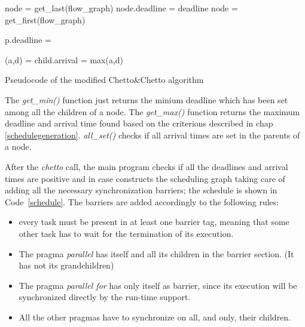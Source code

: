 \documentclass[a4paper,11pt,oneside]{book}
\begin{document}
\begin{algorithm}[H]
\begin{algorithmic}
\State node = get\_last(flow\_graph)
\State node.deadline = deadline
\State {}
\State node = get\_first(flow\_graph)
\State {}
\EndFunction

\end{algorithmic}

\begin{algorithmic}
\State p.deadline =  
\EndFor
{}
\State {}
\EndFor
\EndIf
\EndFunction

\end{algorithmic}

\begin{algorithmic}
\State (a,d) =  
\State child.arrival = max(a,d)
\EndIf
\State {}
\EndFor
\EndIf
\EndFunction

\end{algorithmic}
\caption{Pseudocode of the modified Chetto\&Chetto algorithm }
\end{algorithm}

The \emph{get\_min()} function just returns the minium deadline which has been set among all the children of a node. The \emph{get\_max()} function returns the maximum deadline and arrival time found based on the criterions described in chap \ref{schedulegeneration}. \emph{all\_set()} checks if all arrival times are set in the parents of a node.

After the \emph{chetto} call, the main program checks if all the deadlines and arrival times are positive and in case constructs the scheduling graph taking care of adding all the necessary synchronization barriers; the schedule is shown in Code~\ref{schedule}. The barriers are added accordingly to the following rules:
\begin{itemize}
\item {every task must be present in at least one barrier tag, meaning that some other task has to wait for the termination of its execution.}
\item {The pragma \emph{parallel} has itself and all its children in the barrier section. (It has not its grandchildren)}
\item {The pragma \emph{parallel for} has only itself as barrier, since its execution will be synchronized directly by the run-time support.}
\item {All the other pragmas have to synchronize on all, and only, their children.}

\end{itemize}
\end{document}
